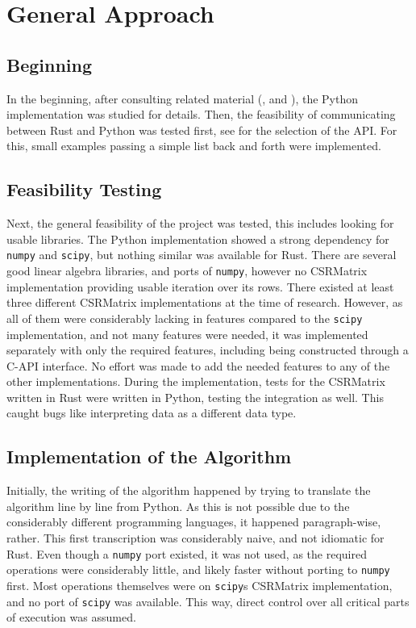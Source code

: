 \section{General Approach}\label{sec:approach}


\subsection{Beginning}

In the beginning, after consulting related material
(\cite{imakaev2012iterative}, \cite{lieberman2009comprehensive} and
\cite{wingett2015hicup}), the Python implementation was studied for details.
Then, the feasibility of communicating between Rust and Python was tested
first, see  for the selection of the API. For this, small
examples passing a simple list back and forth were implemented.

\subsection{Feasibility Testing}

Next, the general feasibility of the project was tested, this includes looking
for usable libraries. The Python implementation showed a strong dependency for
\verb|numpy| and \verb|scipy|, but nothing similar was available for Rust.
There are several good linear algebra libraries, and ports of \verb|numpy|,
however no CSRMatrix implementation providing usable iteration over its rows.
There existed at least three different CSRMatrix implementations at the time of
research. However, as all of them were considerably lacking in features compared
to the \verb|scipy| implementation, and not many features were needed, it was
implemented separately with only the required features, including being
constructed through a C-API interface. No effort was made to add the needed
features to any of the other implementations. During the implementation, tests
for the CSRMatrix written in Rust were written in Python, testing the
integration as well. This caught bugs like interpreting data as a different
data type.


\subsection{Implementation of the Algorithm}

Initially, the writing of the algorithm happened by trying to translate the
algorithm line by line from Python. As this is not possible due to the
considerably different programming languages, it happened paragraph-wise,
rather. This first transcription was considerably naive, and not idiomatic for
Rust. Even though a \verb|numpy| port existed, it was not used, as the required
operations were considerably little, and likely faster without porting
to \verb|numpy| first. Most operations themselves were on \verb|scipy|s
CSRMatrix implementation, and no port of \verb|scipy| was available. This way,
direct control over all critical parts of execution was assumed.


